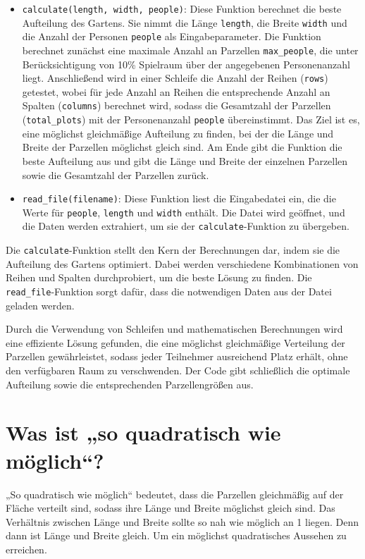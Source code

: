 \documentclass[a4paper,10pt,ngerman]{scrartcl}
\begin{document}
	\begin{itemize}
		\item \texttt{calculate(length, width, people)}: Diese Funktion berechnet 
		die beste Aufteilung des Gartens. Sie nimmt die Länge \texttt{length}, 
		die Breite \texttt{width} und die Anzahl der Personen \texttt{people} als 
		Eingabeparameter. Die Funktion berechnet zunächst eine maximale Anzahl an 
		Parzellen \texttt{max\_people}, die unter Berücksichtigung von 10\% 
		Spielraum über der angegebenen Personenanzahl liegt. Anschließend wird in 
		einer Schleife die Anzahl der Reihen (\texttt{rows}) getestet, wobei für 
		jede Anzahl an Reihen die entsprechende Anzahl an Spalten 
		(\texttt{columns}) berechnet wird, sodass die Gesamtzahl der Parzellen 
		(\texttt{total\_plots}) mit der Personenanzahl \texttt{people} 
		übereinstimmt. Das Ziel ist es, eine möglichst gleichmäßige Aufteilung zu 
		finden, bei der die Länge und Breite der Parzellen möglichst gleich sind. 
		Am Ende gibt die Funktion die beste Aufteilung aus und gibt die Länge und 
		Breite der einzelnen Parzellen sowie die Gesamtzahl der Parzellen zurück.
		
		\item \texttt{read\_file(filename)}: Diese Funktion liest die 
		Eingabedatei ein, die die Werte für \texttt{people}, \texttt{length} und 
		\texttt{width} enthält. Die Datei wird geöffnet, und die Daten werden 
		extrahiert, um sie der \texttt{calculate}-Funktion zu übergeben.
	\end{itemize}
	
	Die \texttt{calculate}-Funktion stellt den Kern der Berechnungen dar, indem 
	sie die Aufteilung des Gartens optimiert. Dabei werden verschiedene 
	Kombinationen von Reihen und Spalten durchprobiert, um die beste Lösung zu 
	finden. Die \texttt{read\_file}-Funktion sorgt dafür, dass die notwendigen 
	Daten aus der Datei geladen werden.
	
	Durch die Verwendung von Schleifen und mathematischen Berechnungen wird eine 
	effiziente Lösung gefunden, die eine möglichst gleichmäßige Verteilung der 
	Parzellen gewährleistet, sodass jeder Teilnehmer ausreichend Platz erhält, 
	ohne den verfügbaren Raum zu verschwenden. Der Code gibt schließlich die 
	optimale Aufteilung sowie die entsprechenden Parzellengrößen aus.
	
	
	\section{Was ist „so quadratisch wie möglich“?}
	„So quadratisch wie möglich“ bedeutet, dass die Parzellen 
	gleichmäßig auf der 
	Fläche verteilt sind, sodass ihre Länge und Breite möglichst 
	gleich sind. Das 
	Verhältnis zwischen Länge und Breite sollte so nah wie möglich 
	an 1 liegen. Denn dann ist Länge und Breite gleich. Um ein 
	möglichst quadratisches Aussehen zu erreichen.
	
	
\end{document}
